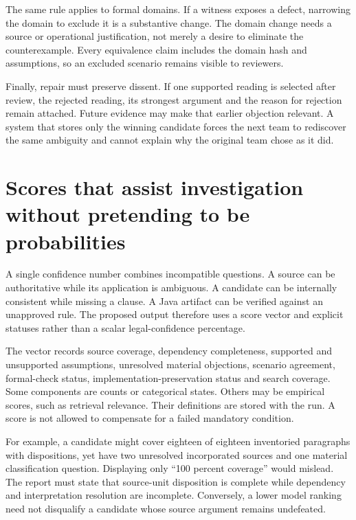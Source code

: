 \documentclass[12pt,a4paper,oneside,openany]{book}
\begin{document}
The same rule applies to formal domains. If a witness exposes a defect, narrowing
the domain to exclude it is a substantive change. The domain change needs a
source or operational justification, not merely a desire to eliminate the
counterexample. Every equivalence claim includes the domain hash and assumptions,
so an excluded scenario remains visible to reviewers.

Finally, repair must preserve dissent. If one supported reading is selected after
review, the rejected reading, its strongest argument and the reason for rejection
remain attached. Future evidence may make that earlier objection relevant. A
system that stores only the winning candidate forces the next team to rediscover
the same ambiguity and cannot explain why the original team chose as it did.

\section{Scores that assist investigation without pretending to be probabilities}
\label{merge:M06:19}


A single confidence number combines incompatible questions. A source can be
authoritative while its application is ambiguous. A candidate can be internally
consistent while missing a clause. A Java artifact can be verified against an
unapproved rule. The proposed output therefore uses a score vector and explicit
statuses rather than a scalar legal-confidence percentage.

The vector records source coverage, dependency completeness, supported and
unsupported assumptions, unresolved material objections, scenario agreement,
formal-check status, implementation-preservation status and search coverage.
Some components are counts or categorical states. Others may be empirical
scores, such as retrieval relevance. Their definitions are stored with the run.
A score is not allowed to compensate for a failed mandatory condition.

For example, a candidate might cover eighteen of eighteen inventoried paragraphs
with dispositions, yet have two unresolved incorporated sources and one material
classification question. Displaying only ``100 percent coverage'' would mislead.
The report must state that source-unit disposition is complete while dependency
and interpretation resolution are incomplete. Conversely, a lower model ranking
need not disqualify a candidate whose source argument remains undefeated.
\end{document}
